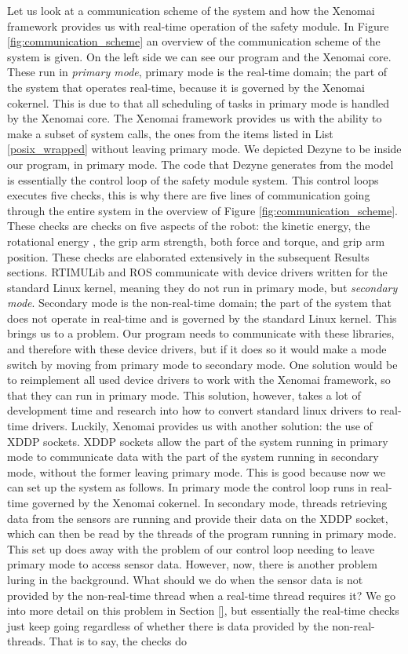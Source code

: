 \documentclass[12pt]{scrreprt}
\begin{document}
Let us look at a communication scheme of the system and how the Xenomai framework provides us with real-time operation of the safety module. In Figure \ref{fig:communication_scheme} an overview of the communication scheme of the system is given. On the left side we can see our program and the Xenomai core. These run in \textit{primary mode}, primary mode is the real-time domain; the part of the system that operates real-time, because it is governed by the Xenomai cokernel. This is due to that all scheduling of tasks in primary mode is handled by the Xenomai core. The Xenomai framework provides us with the ability to make a subset of system calls, the ones from the items listed in List \ref{posix_wrapped} without leaving primary mode. We depicted Dezyne to be inside our program, in primary mode. The code that Dezyne generates from the model is essentially the control loop of the safety module system. This control loops executes five checks, this is why there are five lines of communication going through the entire system in the overview of Figure \ref{fig:communication_scheme}. These checks are checks on five aspects of the robot: the kinetic energy, the rotational energy , the grip arm strength, both force and torque, and grip arm position. These checks are elaborated extensively in the subsequent Results sections. RTIMULib and ROS communicate with device drivers written for the standard Linux kernel, meaning they do not run in primary mode, but \textit{secondary mode}. Secondary mode is the non-real-time domain; the part of the system that does not operate in real-time and is governed by the standard Linux kernel. This brings us to a problem. Our program needs to communicate with these libraries, and therefore with these device drivers, but if it does so it would make a mode switch by moving from primary mode to secondary mode. One solution would be to reimplement all used device drivers to work with the Xenomai framework, so that they can run in primary mode. This solution, however, takes a lot of development time and research into how to convert standard linux drivers to real-time drivers. Luckily, Xenomai provides us with another solution: the use of XDDP sockets. XDDP sockets allow the part of the system running in primary mode to communicate data with the part of the system running in secondary mode, without the former leaving primary mode. This is good because now we can set up the system as follows. In primary mode the control loop runs in real-time governed by the Xenomai cokernel. In secondary mode, threads retrieving data from the sensors are running and provide their data on the XDDP socket, which can then be read by the threads of the program running in primary mode. This set up does away with the problem of our control loop needing to leave primary mode to access sensor data. However, now, there is another problem luring in the background. What should we do when the sensor data is not provided by the non-real-time thread when a real-time thread requires it? We go into more detail on this problem in Section \ref{}, but essentially the real-time checks just keep going regardless of whether there is data provided by the non-real-threads. That is to say, the checks do 
\end{document}
